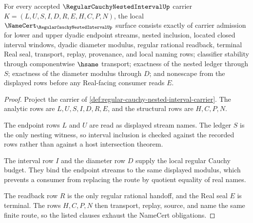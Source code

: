 \begin{theorem}
\label{thm:regular-cauchy-nested-interval-namecert-obligations}
For every accepted $\RegularCauchyNestedIntervalUp$ carrier $K=(L,U,S,I,D,R,E,H,C,P,N)$, the local $\NameCert_{\RegularCauchyNestedIntervalUp}$ surface consists exactly of carrier admission for lower and upper dyadic endpoint streams, nested inclusion, located closed interval windows, dyadic diameter modulus, regular rational readback, terminal Real seal, transport, replay, provenance, and local naming rows; classifier stability through componentwise $\hsame$ transport; exactness of the nested ledger through $S$; exactness of the diameter modulus through $D$; and nonescape from the displayed rows before any Real-facing consumer reads $E$.
\end{theorem}
\begin{proof}
Project the carrier of \autoref{def:regular-cauchy-nested-interval-carrier}. The analytic rows are $L,U,S,I,D,R,E$, and the structural rows are $H,C,P,N$.

The endpoint rows $L$ and $U$ are read as displayed stream names. The ledger $S$ is the only nesting witness, so interval inclusion is checked against the recorded rows rather than against a host intersection theorem.

The interval row $I$ and the diameter row $D$ supply the local regular Cauchy budget. They bind the endpoint streams to the same displayed modulus, which prevents a consumer from replacing the route by quotient equality of real names.

The readback row $R$ is the only regular rational handoff, and the Real seal $E$ is terminal. The rows $H,C,P,N$ then transport, replay, source, and name the same finite route, so the listed clauses exhaust the NameCert obligations.
\end{proof}

